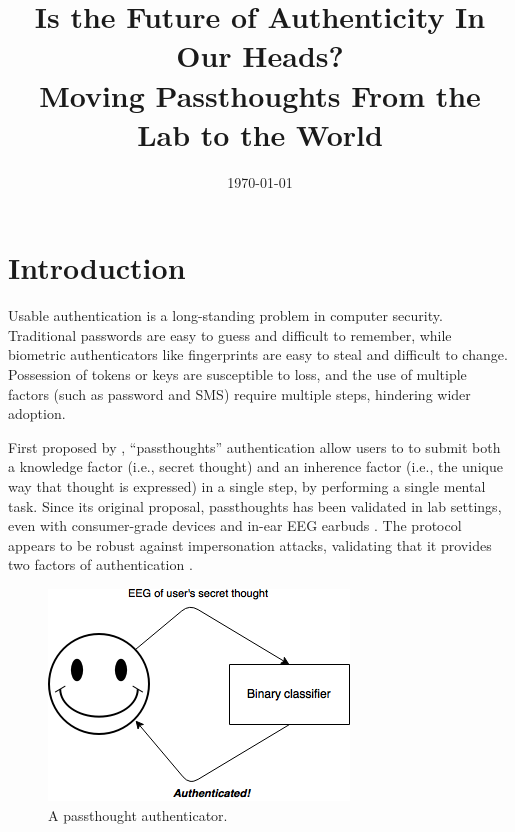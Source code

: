 \documentclass[sigconf]{acmart}
\date{\today}
\title{Is the Future of Authenticity In Our Heads?\\\medskip
\large Moving Passthoughts From the Lab to the World}
\begin{document}
\maketitle

\section{Introduction}
\label{sec:org0a430e5}

Usable authentication is a long-standing problem in computer security.
Traditional passwords are easy to guess and difficult to remember,
while biometric authenticators like fingerprints are easy to steal and difficult to change.
Possession of tokens or keys are susceptible to loss, 
and the use of multiple factors (such as password and SMS) require multiple steps, hindering wider adoption.

First proposed by \cite{Thorpe2005}, ``passthoughts'' authentication allow users to 
to submit both a knowledge factor (i.e., secret thought) and an inherence factor (i.e., the unique way that thought is expressed)
in a single step, by performing a single mental task.
Since its original proposal, passthoughts has been validated in lab settings, even with 
consumer-grade devices \cite{Chuang2013b} and in-ear EEG earbuds \cite{curranpassthoughts}.
The protocol appears to be robust against impersonation attacks, validating that it provides two factors of authentication \cite{Johnson2014}.


\label{fig:diagram}
\begin{figure}[htbp]
\centering
\includegraphics[width=.9\linewidth]{./figures/passthoughts-diagram.png}
\caption{A passthought authenticator.}
\end{figure}
\end{document}

